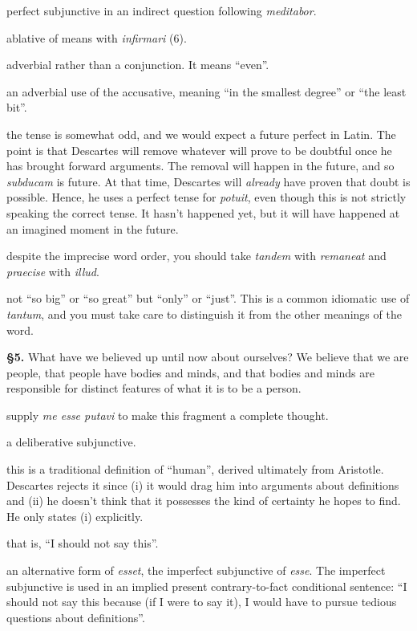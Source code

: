  perfect subjunctive in an indirect question following \textit{meditabor}.

 ablative of means with \textit{infirmari} (6).

 adverbial rather than a conjunction. It means ``even''.

 an adverbial use of the accusative, meaning ``in the smallest degree'' or ``the least bit''.

 the tense is somewhat odd, and we would expect a future perfect in Latin. The point is that Descartes will remove whatever will prove to be doubtful once he has brought forward arguments. The removal will happen in the future, and so \textit{subducam} is future. At that time, Descartes will \textit{already} have proven that doubt is possible. Hence, he uses a perfect tense for \textit{potuit}, even though this is not strictly speaking the correct tense. It hasn't happened yet, but it will have happened at an imagined moment in the future.

 despite the imprecise word order, you should take \textit{tandem} with \textit{remaneat} and \textit{praecise} with \textit{illud}.

 not ``so big'' or ``so great'' but ``only'' or ``just''. This is a common idiomatic use of \textit{tantum}, and you must take care to distinguish it from the other meanings of the word.

\textbf{§5.} What have we believed up until now about ourselves? We believe that we are people, that people have bodies and minds, and that bodies and minds are responsible for distinct features of what it is to be a person.

 supply \textit{me esse putavi} to make this fragment a complete thought.

 a deliberative subjunctive.

 this is a traditional definition of ``human'', derived ultimately from Aristotle. Descartes rejects it since (i) it would drag him into arguments about definitions and (ii) he doesn't think that it possesses the kind of certainty he hopes to find. He only states (i) explicitly.

 that is, ``I should not say this''.

 an alternative form of \textit{esset}, the imperfect subjunctive of \textit{esse}. The imperfect subjunctive is used in an implied present contrary-to-fact conditional sentence: ``I should not say this because (if I were to say it), I would have to pursue tedious questions about definitions''.

